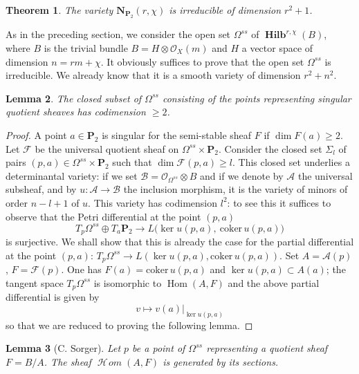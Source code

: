 \documentclass[12pt,english]{smfart}%
\theoremstyle{plain}
\newtheorem{theorem}{Theorem}[section]
\newtheorem{lemma}[theorem]{Lemma}
\theoremstyle{definition}
\theoremstyle{remark}
\newcommand{\PP}{\mathbf{P}}
\newcommand{\Oh}{\mathcal{O}}
\DeclareMathOperator{\Hom}{Hom}
\DeclareMathOperator{\Hilb}{\mathbf{Hilb}}
\newcommand{\Homsh}{\mathop{\mathcal{H}\!\mathit{om}}\nolimits}
\begin{document}
\begin{theorem}\label{thm:irred}
The variety $\mathbf{N}_{\PP_{2}}(r,\chi)$ is irreducible of dimension $r^{2}+1$.
\end{theorem}

As in the preceding section, we consider the open set $\Omega^{ss}$ of $\Hilb^{r,\chi}(B)$, where $B$ is the trivial bundle $B=H\otimes\Oh_{X}(m)$ and $H$ a vector space of dimension $n=rm+\chi$. It obviously suffices to prove that the open set $\Omega^{ss}$ is irreducible. We already know that it is a smooth variety of dimension $r^{2}+n^{2}$.

\begin{lemma}\label{lem:singular-codim}
The closed subset of $\Omega^{ss}$ consisting of the points representing singular quotient sheaves has codimension $\geq 2$.
\end{lemma}

\begin{proof}
A point $a\in\PP_{2}$ is singular for the semi-stable sheaf $F$ if $\dim F(a)\geq 2$. Let $\mathscr{F}$ be the universal quotient sheaf on $\Omega^{ss}\times\PP_{2}$. Consider the closed set $\Sigma_{l}$ of pairs $(p,a)\in\Omega^{ss}\times\PP_{2}$ such that $\dim\mathscr{F}(p,a)\geq l$. This closed set underlies a determinantal variety: if we set $\mathscr{B}=\Oh_{\Omega^{ss}}\otimes B$ and if we denote by $\mathscr{A}$ the universal subsheaf, and by $u:\mathscr{A}\to\mathscr{B}$ the inclusion morphism, it is the variety of minors of order $n-l+1$ of $u$. This variety has codimension $l^{2}$: to see this it suffices to observe that the Petri differential at the point $(p,a)$
\[
T_{p}\Omega^{ss} \oplus T_{a}\PP_{2} \longrightarrow
L\bigl(\ker u(p,a),\ \mathrm{coker}\, u(p,a)\bigr)
\]
is surjective. We shall show that this is already the case for the partial differential at the point $(p,a)$: $T_{p}\Omega^{ss}\to L(\ker u(p,a),\mathrm{coker}\, u(p,a))$. Set $A=\mathscr{A}(p)$, $F=\mathscr{F}(p)$. One has $F(a)=\mathrm{coker}\, u(p,a)$ and $\ker u(p,a)\subset A(a)$; the tangent space $T_{p}\Omega^{ss}$ is isomorphic to $\Hom(A,F)$ and the above partial differential is given by
\[
v \longmapsto v(a)\big|_{\ker u(p,a)}
\]
so that we are reduced to proving the following lemma.
\end{proof}

\begin{lemma}[C. Sorger]\label{lem:sorger}
Let $p$ be a point of $\Omega^{ss}$ representing a quotient sheaf $F=B/A$. The sheaf $\Homsh(A,F)$ is generated by its sections.
\end{lemma}
\end{document}
